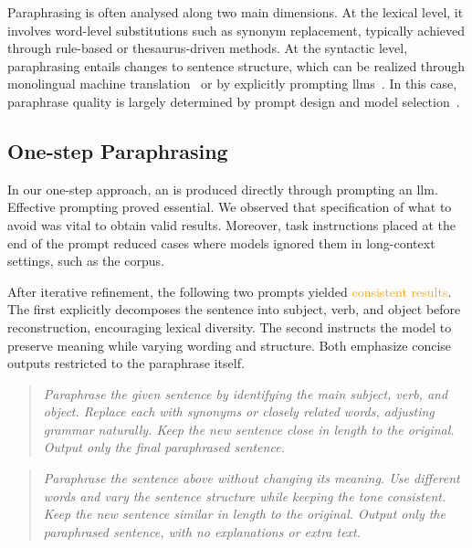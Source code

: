 Paraphrasing is often analysed along two main dimensions. 
At the lexical level, it involves word-level substitutions such as synonym replacement, typically achieved through rule-based or thesaurus-driven methods. 
At the syntactic level, paraphrasing entails changes to sentence structure, which can be realized through monolingual machine translation~\citep{zhou_paraphrase_2021} or by explicitly prompting \acp{llm}~\citep{kurt_pehlivanoglu_comparative_2024}.
In this case, paraphrase quality is largely determined by prompt design and model selection~\citep{Wu_ODD_challenges_2025}.


\subsection{One-step Paraphrasing}

In our one-step approach, an \imp{} is produced directly through prompting an \ac{llm}. 
Effective prompting proved essential.
We observed that specification of what to avoid was vital to obtain valid results. 
Moreover, task instructions placed at the end of the prompt reduced cases where models ignored them in long-context settings, such as the \dataGutenberg{} corpus.

After iterative refinement, the following two prompts yielded \textcolor{orange}{consistent results}.
The first explicitly decomposes the sentence into subject, verb, and object before reconstruction, encouraging lexical diversity. 
The second instructs the model to preserve meaning while varying wording and structure. 
Both emphasize concise outputs restricted to the paraphrase itself.

\begin{quote}
    \textit{Paraphrase the given sentence by identifying the main subject, verb, and object. Replace each with synonyms or closely related words, adjusting grammar naturally. Keep the new sentence close in length to the original. Output only the final paraphrased sentence.}
\end{quote}

\begin{quote}
    \textit{Paraphrase the sentence above without changing its meaning. Use different words and vary the sentence structure while keeping the tone consistent. Keep the new sentence similar in length to the original. Output only the paraphrased sentence, with no explanations or extra text.}
\end{quote}

